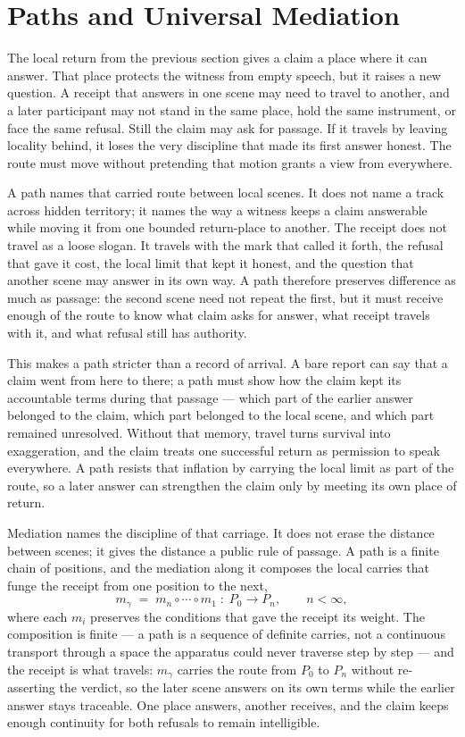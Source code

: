 \section{Paths and Universal Mediation}

The local return from the previous section gives a claim a place where it can answer. That place protects the witness from empty speech, but it raises a new question. A receipt that answers in one scene may need to travel to another, and a later participant may not stand in the same place, hold the same instrument, or face the same refusal. Still the claim may ask for passage. If it travels by leaving locality behind, it loses the very discipline that made its first answer honest. The route must move without pretending that motion grants a view from everywhere.

A path names that carried route between local scenes. It does not name a track across hidden territory; it names the way a witness keeps a claim answerable while moving it from one bounded return-place to another. The receipt does not travel as a loose slogan. It travels with the mark that called it forth, the refusal that gave it cost, the local limit that kept it honest, and the question that another scene may answer in its own way. A path therefore preserves difference as much as passage: the second scene need not repeat the first, but it must receive enough of the route to know what claim asks for answer, what receipt travels with it, and what refusal still has authority.

This makes a path stricter than a record of arrival. A bare report can say that a claim went from here to there; a path must show how the claim kept its accountable terms during that passage --- which part of the earlier answer belonged to the claim, which part belonged to the local scene, and which part remained unresolved. Without that memory, travel turns survival into exaggeration, and the claim treats one successful return as permission to speak everywhere. A path resists that inflation by carrying the local limit as part of the route, so a later answer can strengthen the claim only by meeting its own place of return.

Mediation names the discipline of that carriage. It does not erase the distance between scenes; it gives the distance a public rule of passage. A path is a finite chain of positions, and the mediation along it composes the local carries that funge the receipt from one position to the next,
\[ m_\gamma \;=\; m_n \circ \cdots \circ m_1 \;:\; P_0 \longrightarrow P_n, \qquad n < \infty, \]
where each $m_i$ preserves the conditions that gave the receipt its weight. The composition is finite --- a path is a sequence of definite carries, not a continuous transport through a space the apparatus could never traverse step by step --- and the receipt is what travels: $m_\gamma$ carries the route from $P_0$ to $P_n$ without re-asserting the verdict, so the later scene answers on its own terms while the earlier answer stays traceable. One place answers, another receives, and the claim keeps enough continuity for both refusals to remain intelligible.

